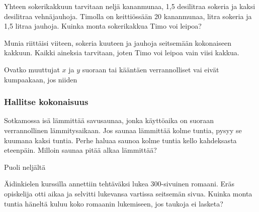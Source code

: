 \begin{tehtavasivu}
\begin{tehtava}
Yhteen sokerikakkuun tarvitaan neljä kananmunaa, 1,5 desilitraa sokeria ja kaksi desilitraa vehnäjauhoja. Timolla on keittiössään 20 kananmunaa, litra sokeria ja 1,5 litraa jauhoja. Kuinka monta sokerikakkua Timo voi leipoa?  
\begin{vastaus}
Munia riittäisi viiteen, sokeria kuuteen ja jauhoja seitsemään kokonaiseen kakkuun. Kaikki aineksia tarvitaan, joten Timo voi leipoa vain viisi kakkua.
\end{vastaus}
\end{tehtava}

\begin{tehtava}
Ovatko muuttujat $ x $ ja $ y $ suoraan tai kääntäen verrannolliset vai eivät kumpaakaan, jos niiden
\begin{alakohdat}
\end{alakohdat}
\begin{vastaus}
\begin{alakohdat}
\end{alakohdat}
\end{vastaus}
\end{tehtava}

\subsubsection*{Hallitse kokonaisuus}


\begin{tehtava}
Sotkamossa isä lämmittää savusaunaa, jonka käyttöaika on suoraan verrannollinen lämmitysaikaan. Jos saunaa lämmittää kolme tuntia, pysyy se kuumana kaksi tuntia. Perhe haluaa saunoa kolme tuntia kello kahdeksasta eteenpäin. Milloin saunaa pitää alkaa lämmittää?
\begin{vastaus}
Puoli neljältä
\end{vastaus}
\end{tehtava}

\begin{tehtava}
Äidinkielen kurssilla annettiin tehtäväksi lukea 300-sivuinen romaani. Eräs opiskelija otti aikaa ja selvitti lukevansa vartissa seitsemän sivua. Kuinka monta tuntia häneltä kuluu koko romaanin lukemiseen, jos taukoja ei lasketa?
    

\end{tehtava}
\end{tehtavasivu}
